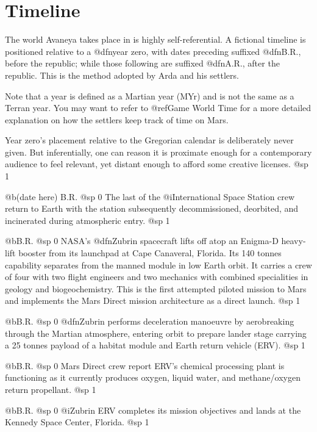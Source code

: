 \chapter{Timeline}

The world Avaneya takes place in is highly self-referential. A fictional timeline is positioned relative to a @dfn{year zero}, with dates preceding suffixed @dfn{B.R.}, before the republic; while those following are suffixed @dfn{A.R.}, after the republic. This is the method adopted by Arda and his settlers. 

Note that a year is defined as a Martian year (MYr) and is not the same as a Terran year. You may want to refer to @ref{Game World Time} for a more detailed explanation on how the settlers keep track of time on Mars.

Year zero's placement relative to the Gregorian calendar is deliberately never given. But inferentially, one can reason it is proximate enough for a contemporary audience to feel relevant, yet distant enough to afford some creative licenses.
@sp 1

@b{(date here) B.R.}
@sp 0
The last of the @i{International Space Station} crew return to Earth with the station subsequently decommissioned, deorbited, and incinerated during atmospheric entry.
@sp 1

@b{B.R.}
@sp 0
NASA's @dfn{Zubrin} spacecraft lifts off atop an Enigma-D heavy-lift booster from its launchpad at Cape Canaveral, Florida. Its 140 tonnes capability separates from the manned module in low Earth orbit. It carries a crew of four with two flight engineers and two mechanics with combined specialities in geology and biogeochemistry. This is the first attempted piloted mission to Mars and implements the Mars Direct mission architecture as a direct launch.
@sp 1

@b{B.R.}
@sp 0
@dfn{Zubrin} performs deceleration manoeuvre by aerobreaking through the Martian atmosphere, entering orbit to prepare lander stage carrying a 25 tonnes payload of a habitat module and Earth return vehicle (ERV).
@sp 1

@b{B.R.}
@sp 0
Mars Direct crew report ERV's chemical processing plant is functioning as it currently produces oxygen, liquid water, and methane/oxygen return propellant.
@sp 1

@b{B.R.}
@sp 0
@i{Zubrin ERV} completes its mission objectives and lands at the Kennedy Space Center, Florida.
@sp 1

